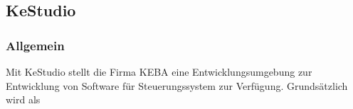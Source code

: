 \subsection{KeStudio}
\subsubsection{Allgemein}
Mit KeStudio stellt die Firma KEBA eine Entwicklungsumgebung zur Entwicklung von Software für Steuerungssystem zur Verfügung. Grundsätzlich wird als 